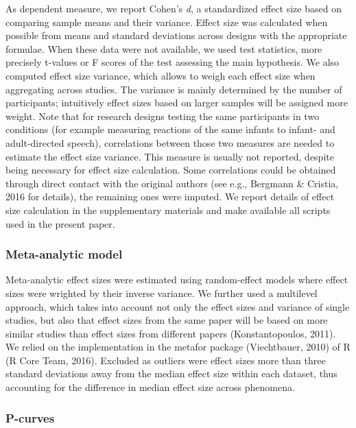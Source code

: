 \documentclass[english,floatsintext,man]{apa6}
\newcounter{author}
\begin{document}
As dependent measure, we report Cohen's \emph{d}, a standardized effect
size based on comparing sample means and their variance. Effect size was
calculated when possible from means and standard deviations across
designs with the appropriate formulae. When these data were not
available, we used test statistics, more precisely t-values or F scores
of the test assessing the main hypothesis. We also computed effect size
variance, which allows to weigh each effect size when aggregating across
studies. The variance is mainly determined by the number of
participants; intuitively effect sizes based on larger samples will be
assigned more weight. Note that for research designs testing the same
participants in two conditions (for example measuring reactions of the
same infants to infant- and adult-directed speech), correlations between
those two measures are needed to estimate the effect size variance. This
measure is usually not reported, despite being necessary for effect size
calculation. Some correlations could be obtained through direct contact
with the original authors (see e.g., Bergmann \& Cristia, 2016 for
details), the remaining ones were imputed. We report details of effect
size calculation in the supplementary materials and make available all
scripts used in the present paper.

\subsubsection{Meta-analytic model}\label{meta-analytic-model}

Meta-analytic effect sizes were estimated using random-effect models
where effect sizes were wrighted by their inverse variance. We further
used a multilevel approach, which takes into account not only the effect
sizes and variance of single studies, but also that effect sizes from
the same paper will be based on more similar studies than effect sizes
from different papers (Konstantopoulos, 2011). We relied on the
implementation in the metafor package (Viechtbauer, 2010) of R (R Core
Team, 2016). Excluded as outliers were effect sizes more than three
standard deviations away from the median effect size within each
dataset, thus accounting for the difference in median effect size across
phenomena.

\subsubsection{P-curves}\label{p-curves}
\end{document}
